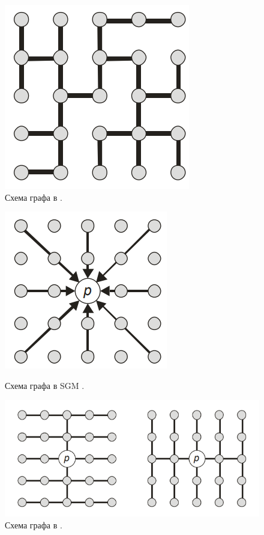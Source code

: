 \documentclass[oneside,final,12pt]{scrartcl}
\begin{document}
\begin{figure}[h]
				\includegraphics[width=0.8\linewidth]{graph_2.png}
				\caption{Схема графа в \cite{Veksler2005}.}
				\label{fig:graph_2}
				\endminipage\hfill
			\end{figure}
			\begin{figure}[h]
				\centering
				\includegraphics[width=0.8\linewidth]{graph_3.png}
				\caption{Схема графа в SGM \cite{Hirschmuller2008}.}
				\label{fig:graph_3}
				\endminipage\hfill
				\centering
				\includegraphics[width=0.8\linewidth]{graph_4.png}
				\caption{Схема графа в  \cite{Bleyer2008}.}
				\label{fig:graph_4}
				\endminipage\hfill
			\end{figure}
\end{document}
